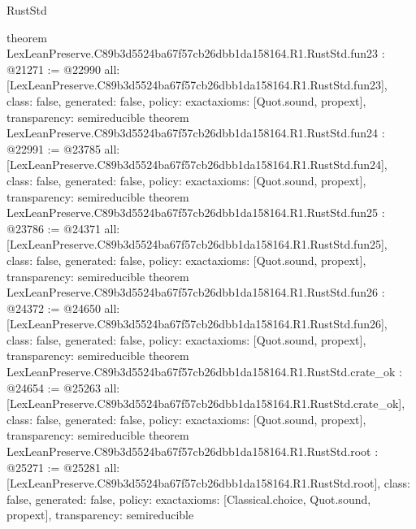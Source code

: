 \begin{lexlean}{RustStd}
\begin{coremodule}
{}
theorem LexLeanPreserve.C89b3d5524ba67f57cb26dbb1da158164.R1.RustStd.fun23 : @21271 := @22990 {
  all: [LexLeanPreserve.C89b3d5524ba67f57cb26dbb1da158164.R1.RustStd.fun23],
  class: false,
  generated: false,
  policy: exact{axioms: [Quot.sound, propext]},
  transparency: semireducible
}
theorem LexLeanPreserve.C89b3d5524ba67f57cb26dbb1da158164.R1.RustStd.fun24 : @22991 := @23785 {
  all: [LexLeanPreserve.C89b3d5524ba67f57cb26dbb1da158164.R1.RustStd.fun24],
  class: false,
  generated: false,
  policy: exact{axioms: [Quot.sound, propext]},
  transparency: semireducible
}
theorem LexLeanPreserve.C89b3d5524ba67f57cb26dbb1da158164.R1.RustStd.fun25 : @23786 := @24371 {
  all: [LexLeanPreserve.C89b3d5524ba67f57cb26dbb1da158164.R1.RustStd.fun25],
  class: false,
  generated: false,
  policy: exact{axioms: [Quot.sound, propext]},
  transparency: semireducible
}
theorem LexLeanPreserve.C89b3d5524ba67f57cb26dbb1da158164.R1.RustStd.fun26 : @24372 := @24650 {
  all: [LexLeanPreserve.C89b3d5524ba67f57cb26dbb1da158164.R1.RustStd.fun26],
  class: false,
  generated: false,
  policy: exact{axioms: [Quot.sound, propext]},
  transparency: semireducible
}
theorem LexLeanPreserve.C89b3d5524ba67f57cb26dbb1da158164.R1.RustStd.crate_ok : @24654 := @25263 {
  all: [LexLeanPreserve.C89b3d5524ba67f57cb26dbb1da158164.R1.RustStd.crate_ok],
  class: false,
  generated: false,
  policy: exact{axioms: [Quot.sound, propext]},
  transparency: semireducible
}
theorem LexLeanPreserve.C89b3d5524ba67f57cb26dbb1da158164.R1.RustStd.root : @25271 := @25281 {
  all: [LexLeanPreserve.C89b3d5524ba67f57cb26dbb1da158164.R1.RustStd.root],
  class: false,
  generated: false,
  policy: exact{axioms: [Classical.choice, Quot.sound, propext]},
  transparency: semireducible
}


\end{coremodule}
\end{lexlean}
